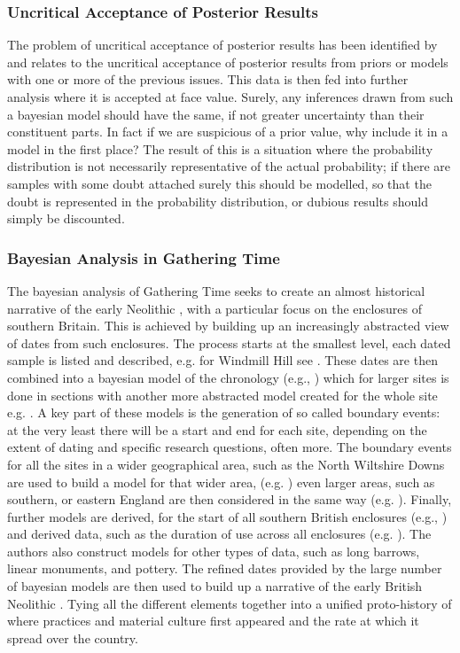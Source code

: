 \subsubsection{Uncritical Acceptance of Posterior Results}
The problem of uncritical acceptance of posterior results has been identified by \citet[528]{doi:10.1080/00438243.2015.1070082} and relates to the uncritical acceptance of posterior results from priors or models with one or more of the previous issues. This data is then fed into further analysis where it is accepted at face value. Surely, any inferences drawn from such a bayesian model should have the same, if not greater uncertainty than their constituent parts. In fact if we are suspicious of a prior value, why include it in a model in the first place? The result of this is a situation where the probability distribution is not necessarily representative of the actual probability; if there are samples with some doubt attached surely this should be modelled, so that the doubt is represented in the probability distribution, or dubious results should simply be discounted.

\subsubsection{Bayesian Analysis in Gathering Time}
The bayesian analysis of Gathering Time seeks to create an almost historical narrative of the early Neolithic \citep[800]{Whittle:2011tg}, with a particular focus on the enclosures of southern Britain. This is achieved by building up an increasingly abstracted view of dates from such enclosures. The process starts at the smallest level, each dated sample is listed and described, e.g. for Windmill Hill see \citet[68]{Whittle:2011kl}. These dates are then combined into a bayesian model of the chronology (e.g., \citealp[83]{Whittle:2011kl}) which for larger sites is done in sections with another more abstracted model created for the whole site e.g. \citealp[83]{Whittle:2011kl}. A key part of these models is the generation of so called boundary events: at the very least there will be a start and end for each site, depending on the extent of dating and specific research questions, often more. The boundary events for all the sites in a wider geographical area, such as the North Wiltshire Downs are used to build a model for that wider area, (e.g. \citealp[106]{Whittle:2011kl}) even larger areas, such as southern, or eastern England are then considered in the same way (e.g. \citealp[684]{Whittle:2011tg}). Finally, further models are derived, for the start of all southern British enclosures (e.g., \citealp[687]{Whittle:2011tg}) and derived data, such as the duration of use across all enclosures (e.g. \citealp[706]{Whittle:2011tg}). The authors also construct models for other types of data, such as long barrows, linear monuments, and pottery. The refined dates provided by the large number of bayesian models are then used to build up a narrative of the early British Neolithic \citep[800]{Whittle:2011tg}. Tying all the different elements together into a unified proto-history of where practices and material culture first appeared and the rate at which it spread over the country.

